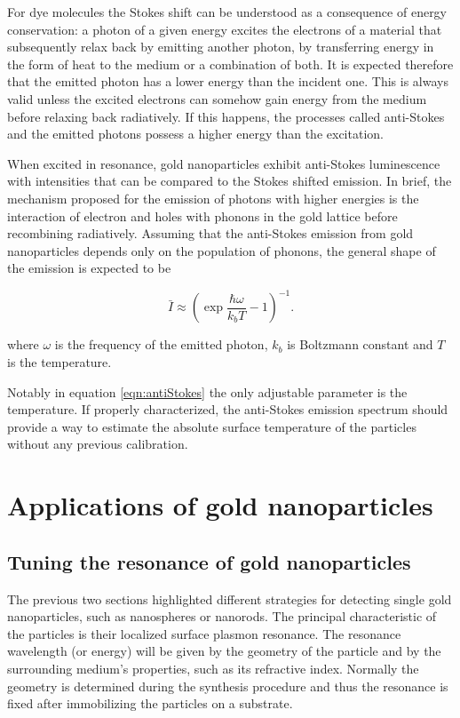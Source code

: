 
For dye molecules the Stokes shift can be understood as a consequence of energy
conservation: a photon of a given energy excites the electrons of a material
that subsequently relax back by emitting another photon, by transferring energy
in the form of heat to the medium or a combination of both. It is expected
therefore that the emitted photon has a lower energy than the incident one. This
is always valid unless the excited electrons can somehow gain energy from the
medium before relaxing back radiatively. If this happens, the processes called
anti-Stokes and the emitted photons possess a higher energy than the excitation.

When excited in resonance, gold nanoparticles exhibit anti-Stokes luminescence
with intensities that can be compared to the Stokes shifted emission. In brief, 
the mechanism proposed for the emission of photons with higher energies is the
interaction of electron and holes with phonons in the gold lattice before
recombining radiatively. Assuming that the anti-Stokes emission from gold
nanoparticles depends only on the population of phonons, the general shape of
the emission is expected to be

\begin{equation}\label{eqn:antiStokes}
	\bar{I}\approx\left(\exp\frac{\hbar\omega}{k_bT}-1\right)^{-1}.
\end{equation}

\noindent where $\omega$ is the frequency of the emitted photon, $k_b$ is
Boltzmann constant and $T$ is the temperature. 

Notably in equation \ref{eqn:antiStokes} the only adjustable parameter is the
temperature. If properly characterized, the anti-Stokes emission spectrum should
provide a way to estimate the absolute surface temperature of the particles
without any previous calibration.

\section{Applications of gold nanoparticles}
\subsection{Tuning the resonance of gold nanoparticles}
The previous two sections highlighted different strategies for detecting single
gold nanoparticles, such as nanospheres or nanorods. The principal
characteristic of the particles is their localized surface plasmon
resonance. The resonance wavelength (or energy) will be given by the geometry of
the particle and by the surrounding medium's properties, such as its refractive
index. Normally the geometry is determined during the synthesis
procedure and thus the resonance is fixed after immobilizing the particles on a
substrate.

